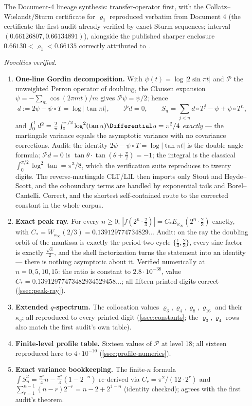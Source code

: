 \documentclass[11pt,oneside]{article}
\theoremstyle{definition}
\theoremstyle{remark}
\newcommand{\T}{T}
\begin{document}
The Document-4 lineage synthesis: transfer-operator first, with the
Collatz--Wielandt/Sturm certificate for $\varrho_1$ reproduced verbatim
from Document 4 (the certificate the first audit already verified by
exact Sturm sequences; interval $(0.66126807,0.66134891)$), alongside
the published sharper enclosure $0.66130<\varrho_1<0.66135$ correctly
attributed to \cite{ahl2017}.

\emph{Novelties verified.}
\begin{enumerate}
\item \textbf{One-line Gordin decomposition.}  With
$\psi(t)=\log|2\sin\pi t|$ and $\mathcal P$ the unweighted Perron
operator of doubling, the Clausen expansion
$\psi=-\sum_m\cos(2\pi mt)/m$ gives $\mathcal P\psi=\psi/2$; hence
\[
 d:=2\psi-\psi\circ\T=\log|\tan\pi t|,
 \qquad
 \mathcal Pd=0,
 \qquad
 S_n=\sum_{j<n}d\circ\T^j-\psi+\psi\circ\T^n,
\]
and $\int_0^1d^2=\frac2\pi\int_0^{\pi/2}\log^2(\tan u)\Differential u=\pi^2/4$
\emph{exactly} --- the martingale variance equals the asymptotic
variance with no covariance corrections.  Audit: the identity
$2\psi-\psi\circ\T=\log|\tan\pi t|$ is the double-angle formula;
$\mathcal Pd=0$ is $\tan\theta\cdot\tan(\theta+\frac\pi2)=-1$; the
integral is the classical $\int_0^{\pi/2}\log^2\tan=\pi^3/8$, which the
verification suite reproduces to twenty digits.  The reverse-martingale
CLT/LIL then imports only Stout and Heyde--Scott, and the coboundary
terms are handled by exponential tails and Borel--Cantelli.  Correct,
and the shortest self-contained route to the corrected constant in the
whole corpus.
\item \textbf{Exact peak ray.}  For every $n\ge0$,
$|f(2^n\cdot\frac23)|=C_*E_{\kappa_\infty}(2^n\cdot\frac23)$ exactly,
with $C_*=W_{\kappa_\infty}(2/3)=0.139129774734829\ldots$  Audit: on
the ray the doubling orbit of the mantissa is exactly the period-two
cycle $\{\frac13,\frac23\}$, every sine factor is exactly
$\frac{\sqrt3}2$, and the shell factorization turns the statement into
an identity --- there is nothing asymptotic about it.  Verified
numerically at $n=0,5,10,15$: the ratio is constant to $2.8\cdot10^{-38}$,
value $C_*=0.13912977473482934529458\ldots$; all fifteen printed digits
correct (\cref{ssec:peak-ray}).
\item \textbf{Extended $q$-spectrum.}  The collocation values
$\varrho_3,\varrho_4,\varrho_8,\varrho_{16}$ and their $\kappa_q$;
all reproduced to every printed digit (\cref{ssec:constants}; the
$\varrho_3,\varrho_4$ rows also match the first audit's own table).
\item \textbf{Finite-level profile table.}  Sixteen values of
$\mathscr P$ at level 18; all sixteen reproduced here to
$4\cdot10^{-10}$ (\cref{ssec:profile-numerics}).
\item \textbf{Exact variance bookkeeping.}  The finite-$n$ formula
$\int S_n^2=\frac{\pi^2}4n-\frac{\pi^2}3(1-2^{-n})$ re-derived via
$C_r=\pi^2/(12\cdot2^r)$ and
$\sum_{r=1}^{n-1}(n-r)2^{-r}=n-2+2^{1-n}$ (identity checked); agrees
with the first audit's theorem.
\end{enumerate}
\end{document}
